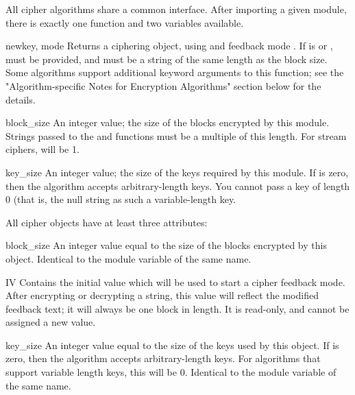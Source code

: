 \documentclass{howto}
\begin{document}
All cipher algorithms share a common interface.  After importing a
given module, there is exactly one function and two variables
available.

\begin{funcdesc}{new}{key, mode}
Returns a ciphering object, using  and feedback mode
.  If  is  or ,  must be provided,
and must be a string of the same length as the block size.  Some
algorithms support additional keyword arguments to this function; see
the "Algorithm-specific Notes for Encryption Algorithms" section below for the details.
\end{funcdesc}

\begin{datadesc}{block_size}
An integer value; the size of the blocks encrypted by this module.
Strings passed to the  and  functions
must be a multiple of this length.  For stream ciphers,
 will be 1. 
\end{datadesc}

\begin{datadesc}{key_size}
An integer value; the size of the keys required by this module.  If
 is zero, then the algorithm accepts arbitrary-length
keys.  You cannot pass a key of length 0 (that is, the null string
 as such a variable-length key.  
\end{datadesc}

All cipher objects have at least three attributes:

\begin{memberdesc}{block_size}
An integer value equal to the size of the blocks encrypted by this object.
Identical to the module variable of the same name.
\end{memberdesc}

\begin{memberdesc}{IV}
Contains the initial value which will be used to start a cipher
feedback mode.  After encrypting or decrypting a string, this value
will reflect the modified feedback text; it will always be one block
in length.  It is read-only, and cannot be assigned a new value.
\end{memberdesc}

\begin{memberdesc}{key_size}
An integer value equal to the size of the keys used by this object.  If
 is zero, then the algorithm accepts arbitrary-length
keys.  For algorithms that support variable length keys, this will be 0.
Identical to the module variable of the same name.  
\end{memberdesc}
\end{document}
